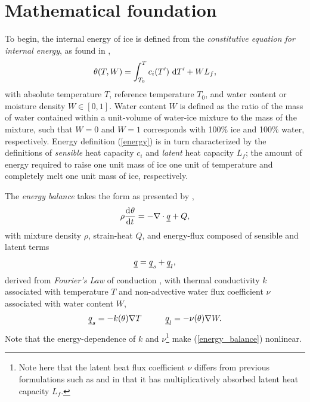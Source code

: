 
\section{Mathematical foundation}

To begin, the internal energy  of ice is defined from the \emph{constitutive equation for internal energy}, as found in \citet{greve_2009},
\begin{align}
  \label{energy}
  \theta(T,W) = \int_{T_0}^T c_i(T') \ \mathrm{d}T' + W L_f,
\end{align}
with absolute temperature $T$, reference temperature $T_0$, and  water content or moisture density $W \in [0,1]$.  Water content $W$ is defined as the ratio of the mass of water contained within a unit-volume of water-ice mixture to the mass of the mixture, such that $W=0$ and $W=1$ corresponds with 100\% ice and 100\% water, respectively.  Energy definition (\ref{energy}) is in turn characterized by the definitions of   \emph{sensible} heat capacity $c_i$ and \emph{latent} heat capacity $L_f$; the amount of energy required to raise one unit mass of ice one unit of temperature and completely melt one unit mass of ice, respectively.

The  \emph{energy balance} takes the form as presented by \citet{greve_1997},
\begin{align}
  \label{energy_balance}
  \rho \frac{\mathrm{d}^{} \theta}{\mathrm{d} t^{} } = - \nabla \cdot \underline{q} + Q,
\end{align}
with mixture density $\rho$, strain-heat $Q$, and energy-flux composed of sensible and latent terms
\begin{align}
  \label{flux}
  \underline{q} = \underline{q}_s + \underline{q}_l,
\end{align}
derived from \emph{Fourier's Law} of conduction \citep{davis_2013}, with thermal conductivity $k$ associated with temperature $T$ and non-advective water flux coefficient $\nu$ associated with water content $W$,
\begin{align}
  \label{individual_flux}
  \rankone{q}_s = - k(\theta) \nabla T \hspace{10mm} 
  \rankone{q}_l = - \nu(\theta) \nabla W.
\end{align}
Note that the energy-dependence of $k$ and $\nu$\footnote{Note here that the latent heat flux coefficient $\nu$ differs from previous formulations such as \citet{greve_1997} and \citet{aschwanden_2012} in that it has multiplicatively absorbed latent heat capacity $L_f$.} make (\ref{energy_balance}) nonlinear.


